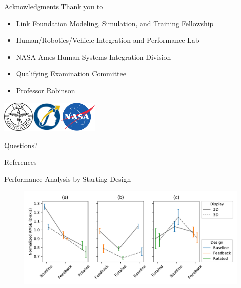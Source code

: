 \documentclass[10pt]{beamer}
\begin{document}
\begin{frame}[fragile]{Acknowledgments}
  Thank you to
  \begin{itemize}
    \item Link Foundation Modeling, Simulation, and Training Fellowship
    \item Human/Robotics/Vehicle Integration and Performance Lab
    \item NASA Ames Human Systems Integration Division
    \item Qualifying Examination Committee
    \item Professor Robinson
  \end{itemize}
  \hfill\includegraphics[height=1.5cm]{../img/linkfoundation.png}\includegraphics[height=1.5cm]{../img/hrvip.png}\includegraphics[height=1.5cm]{../img/nasa.png}
\end{frame}

\begin{frame}[standout]
  Questions?
\end{frame}

\appendix

\begin{frame}[allowframebreaks]{References}
  
  
\end{frame}

\begin{frame}[fragile]{Performance Analysis by Starting Design}
\begin{figure}
  \begin{center}
    \includegraphics[width=\linewidth]{../img/x_design_y_zrmse_col_startdesign_hue_device.pdf}
  \end{center}
\end{figure}
\end{frame}
\end{document}

